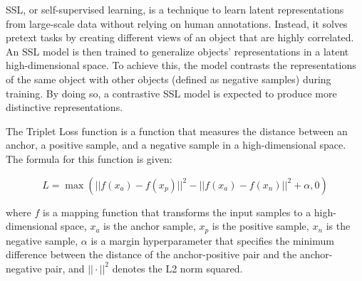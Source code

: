 SSL, or self-supervised learning, is a technique to learn latent representations from large-scale data without relying on human annotations. Instead, it solves pretext tasks by creating different views of an object that are highly correlated. An SSL model is then trained to generalize objects' representations in a latent high-dimensional space. To achieve this, the model contrasts the representations of the same object with other objects (defined as negative samples) during training. By doing so, a contrastive SSL model is expected to produce more distinctive representations. 

The Triplet Loss function is a function that measures the distance between an anchor, a positive sample, and a negative sample in a high-dimensional space. The formula for this function is given:

$$L = \max( ||f(x_{a}) - f(x_{p})||^{2} - ||f(x_{a}) - f(x_{n})||^{2} + \alpha, 0 )$$

where $f$ is a mapping function that transforms the input samples to a high-dimensional space, $x_{a}$ is the anchor sample, $x_{p}$ is the positive sample, $x_{n}$ is the negative sample, $\alpha$ is a margin hyperparameter that specifies the minimum difference between the distance of the anchor-positive pair and the anchor-negative pair, and $||\cdot||^{2}$ denotes the L2 norm squared.